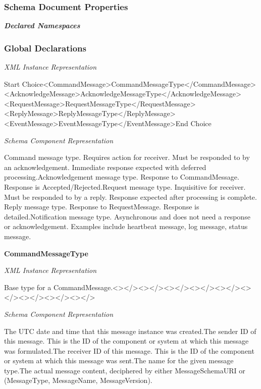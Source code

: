 

      \subsubsection{Schema Document Properties}

      \bf\noindent\emph{Declared Namespaces}

      \subsubsection{Global Declarations}

    

    \bf{} 
    
    \emph{XML Instance Representation}
    
    Start Choice<CommandMessage>CommandMessageType</CommandMessage><AcknowledgeMessage>AcknowledgeMessageType</AcknowledgeMessage><RequestMessage>RequestMessageType</RequestMessage><ReplyMessage>ReplyMessageType</ReplyMessage><EventMessage>EventMessageType</EventMessage>End Choice

    \emph{Schema Component Representation}
    
    Command message type.  Requires action for receiver.  Must be responded to by an acknowledgement.  Immediate response expected with deferred processing.Acknowledgement message type.  Response to CommandMessage.  Response is Accepted/Rejected.Request message type.  Inquisitive for receiver.  Must be responded to by a reply.  Response expected after processing is complete. Reply message type.  Response to RequestMessage.  Response is detailed.Notification message type.  Asynchronous and does not need a response or acknowledgement.  Examples include heartbeat message, log message, status message.

    \bf{} CommandMessageType
    
    \emph{XML Instance Representation}
    
    Base type for a CommandMessage.<></><></><></><></><></><></><></><></><></>

    \emph{Schema Component Representation}
    
    The UTC date and time that this message instance was created.The sender ID of this message.  This is the ID of the component or system at which this message was formulated.The receiver ID of this message.  This is the ID of the component or system at which this message was sent.The name for the given message type.The actual message content, deciphered by either MessageSchemaURI or (MessageType, MessageName, MessageVersion).

